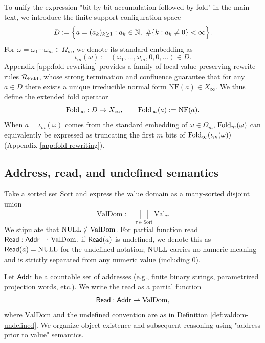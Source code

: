 \begin{definition}\label{def:fold-extension-domain}
To unify the expression "bit-by-bit accumulation followed by fold" in the main text, we introduce the finite-support configuration space
$$
D:=\Bigl\{a=(a_k)_{k\ge 1}: a_k\in\NN,\ \#\{k:a_k\neq 0\}<\infty\Bigr\}.
$$
For $\omega=\omega_1\cdots\omega_m\in\Omega_m$, we denote its standard embedding as
$$
\iota_m(\omega):=(\omega_1,\dots,\omega_m,0,0,\dots)\in D.
$$
Appendix \ref{app:fold-rewriting} provides a family of local value-preserving rewrite rules $\mathcal{R}_{\mathrm{Fold}}$, whose strong termination and confluence guarantee that for any $a\in D$ there exists a unique irreducible normal form $\mathrm{NF}(a)\in X_\infty$. We thus define the extended fold operator
$$
\mathrm{Fold}_\infty:D\to X_\infty,\qquad \mathrm{Fold}_\infty(a):=\mathrm{NF}(a).
$$
When $a=\iota_m(\omega)$ comes from the standard embedding of $\omega\in\Omega_m$, $\mathrm{Fold}_m(\omega)$ can equivalently be expressed as truncating the first $m$ bits of $\mathrm{Fold}_\infty(\iota_m(\omega))$ (Appendix \ref{app:fold-rewriting}).\par
\end{definition}

\subsection{Address, read, and undefined semantics}
\begin{definition}\label{def:valdom-undefined}
Take a sorted set $\mathrm{Sort}$ and express the value domain as a many-sorted disjoint union
$$
\mathrm{ValDom}:=\bigsqcup_{\tau\in\mathrm{Sort}}\mathrm{Val}_\tau.
$$
We stipulate that $\mathrm{NULL}\notin \mathrm{ValDom}$. For partial function read $\mathsf{Read}:\mathsf{Addr}\rightharpoonup \mathrm{ValDom}$, if $\mathsf{Read}(a)$ is undefined, we denote this as $\mathsf{Read}(a)=\mathrm{NULL}$ for the undefined notation; $\mathrm{NULL}$ carries no numeric meaning and is strictly separated from any numeric value (including $0$).\par
\end{definition}

Let $\mathsf{Addr}$ be a countable set of addresses (e.g., finite binary strings, parametrized projection words, etc.). We write the read as a partial function
$$
\mathsf{Read}:\mathsf{Addr}\rightharpoonup \mathrm{ValDom},
$$
where $\mathrm{ValDom}$ and the undefined convention are as in Definition \ref{def:valdom-undefined}. We organize object existence and subsequent reasoning using "address prior to value" semantics.\par


